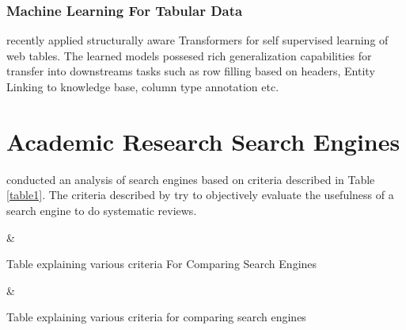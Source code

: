 \subsubsection{Machine Learning For Tabular Data}
\cite{deng2020turl} recently applied structurally aware Transformers for self supervised learning of web tables. The learned models possesed rich generalization capabilities for transfer into downstreams tasks such as row filling based on headers, Entity Linking to knowledge base, column type annotation etc. 

\section{Academic Research Search Engines}
\label{relatedwork:acad-search-engine}
\cite{gusenbauer2020academic} conducted an analysis of search engines based on criteria described in Table \ref{table1}.
The criteria described by \cite{gusenbauer2020academic} try to objectively evaluate the usefulness of a search engine to do systematic reviews.

\begin{table}[h]
    \label{table\arabic{tablecounter}}
            {\Criteria & \Meaning}
            \centering
            \caption{\label{tablecounter}Table explaining various criteria For Comparing Search Engines}
\end{table}

\begin{table}[h]
    \label{table\arabic{tablecounter}}
            {\Criteria & \Meaning}
            \centering
            \caption{\label{tablecounter}Table explaining various criteria for comparing search engines}
\end{table}

